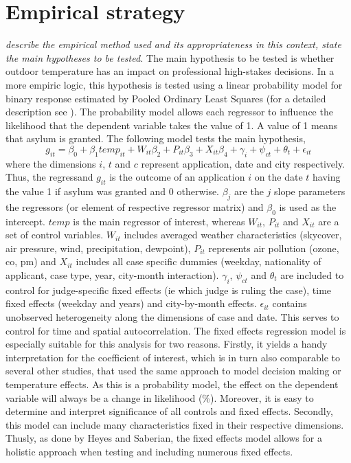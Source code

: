 \documentclass[11pt]{article}
\begin{document}
	\section{Empirical strategy}
	\textit{describe the empirical method used and its appropriateness in this context, state the main hypotheses to be tested.}
	The main hypothesis to be tested is whether outdoor temperature has an impact on professional high-stakes decisions. In a more empiric logic, this hypothesis is tested using a linear probability model for binary response estimated by Pooled Ordinary Least Squares (for a detailed description see \cite{wooldridge2010econometric}). The probability model allows each regressor to influence the likelihood that the dependent variable takes the value of 1. A value of 1 means that asylum is granted. The following model tests the main hypothesis, 
	\newline
	\begin{equation}
		g_{ it } = \beta_{0} + \beta_{1 }temp_{it} + W_{it}\beta_{2} + P_{it}\beta_{3} + X_{it}\beta_{4} + \gamma_{i} + \psi_{ct} + \theta_{t} + \epsilon_{it}
	\end{equation}
	where the dimensions \(i\), \(t\) and \(c\) represent application, date and city respectively. Thus, the regressand \(g_{ it }\) is the outcome of an application \(i\) on the date \(t\) having the value 1 if asylum was granted and 0 otherwise. \(\beta_{j}\) are the \(j\) slope parameters the regressors (or element of respective regressor matrix) and \(\beta_{0}\) is used as the intercept. \(temp\) is the main regressor of interest, whereas \(W_{it}\), \(P_{it}\) and \(X_{it}\) are a set of control variables. \(W_{it}\) includes averaged weather characteristics (skycover, air pressure, wind, precipitation, dewpoint), \(P_{it}\) represents air pollution (ozone, co, pm) and \(X_{it}\) includes all case specific dummies (weekday, nationality of applicant, case type, year, city-month interaction). \(\gamma_{i}\), \(\psi_{ct}\) and \(\theta_{t}\) are included to control for judge-specific fixed effects (ie which judge is ruling the case), time fixed effects (weekday and years) and city-by-month effects. \(\epsilon_{it}\) contains unobserved heterogeneity along the dimensions of case and date. This serves to control for time and spatial autocorrelation. 
	The fixed effects regression model is especially suitable for this analysis for two reasons. Firstly, it yields a handy interpretation for the coefficient of interest, which is in turn also comparable to several other studies, that used the same approach to model decision making or temperature effects. As this is a probability model, the effect on the dependent variable will always be a change in likelihood (\%). Moreover, it is easy to determine and interpret significance of all controls and fixed effects. Secondly, this model can include many characteristics fixed in their respective dimensions. Thusly, as done by Heyes and Saberian, the fixed effects model allows for a holistic approach when testing and including numerous fixed effects.
\end{document}
